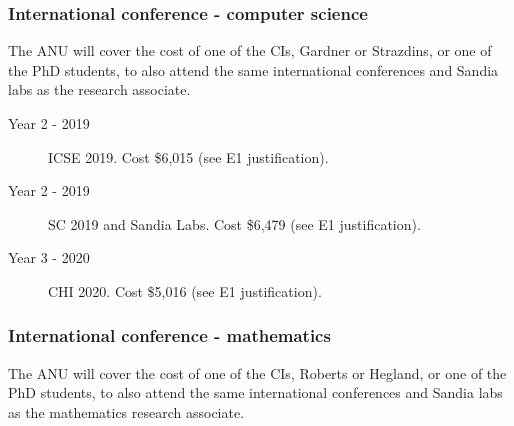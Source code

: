 \documentclass[a4paper,twoside,12pt,compact]{article}
\begin{document}
\subsubsection*{International conference - computer science}


The ANU will cover the cost of one of the CIs, Gardner or Strazdins, or one of the PhD students,
to also attend the same international conferences and Sandia labs as the 
research associate. 


\begin{description}
\item[Year 2 - 2019] ICSE 2019. Cost \$6,015 (see E1 justification).

\item[Year 2 - 2019] SC 2019 and Sandia Labs.  Cost \$6,479  (see E1 justification).

\item[Year 3 - 2020] CHI 2020.  Cost \$5,016 (see E1 justification).

\end{description}


\subsubsection*{International conference - mathematics}

The ANU will cover the cost of one of the CIs, Roberts or Hegland, or one of the PhD students, 
to also attend the same international conferences and Sandia labs as the 
mathematics research associate. 

\end{document}

